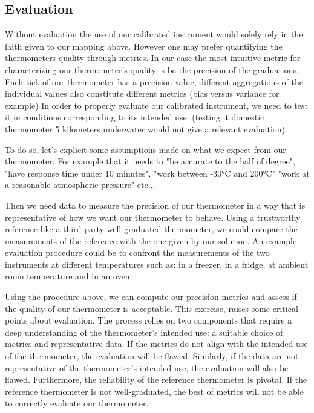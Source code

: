 \begin{bibunit}
\subsection{Evaluation}

Without evaluation the use of our calibrated instrument would solely rely in the faith given to our mapping above.
However one may prefer quantifying the thermometers quality through metrics.
In our case the most intuitive metric for characterizing our thermometer's quality is be the precision of the graduations.
Each tick of our thermometer has a precision value, different aggregations of the individual values also constitute different metrics (bias versus variance for example)
In order to properly evaluate our calibrated instrument, we need to test it in conditions corresponding to its intended use. (testing it domestic thermometer 5 kilometers underwater would not give a relevant evaluation).

 To do so, let's explicit some assumptions made on what we expect from our thermometer.
  For example that it needs to "be accurate to the half of degree", "have response time under 10 minutes", "work between -30°C and 200°C" "work at a reasonable atmospheric pressure" etc...

Then we need data to measure the precision of our thermometer in a way that is representative of how we want our thermometer to behave. Using a trustworthy reference like a third-party well-graduated thermometer, we could compare the measurements of the reference with the one given by our solution.
  An example evaluation procedure could be to confront the measurements of the two instruments at different temperatures such as: in a freezer, in a fridge, at ambient room temperature and in an oven.

Using the procedure above, we can compute our precision metrics and assess if the quality of our thermometer is acceptable.
This exercise, raises some critical points about evaluation. The process relies on two components that require a deep understanding of the thermometer's intended use: a suitable choice of metrics and representative data.
If the metrics do not align with the intended use of the thermometer, the evaluation will be flawed. Similarly, if the data are not representative of the thermometer's intended use, the evaluation will also be flawed.
 Furthermore, the reliability of the reference thermometer is pivotal. If the reference thermometer is not well-graduated, the best of metrics will not be able to correctly evaluate our thermometer. 


\end{bibunit}
